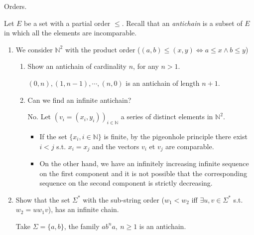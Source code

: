 \documentclass[a4paper,11pt]{exam}
\newcommand{\N}{\mathbb{N}}
\begin{document}
	
	\colorbox{gris}{
		\begin{minipage}[c]{15cm}
			Orders.
		\end{minipage}
	}
	
	
	
	
	\begin{questions}
		\question
		Let $E$ be a set with a partial order $\leq$.
		Recall that an \textit{antichain} is a subset of $E$ in which all the elements are incomparable.
		
		\begin{enumerate}
			\item We consider $ \N^2 $ with the product order ($(a,b)\leq(x,y) \iff a\leq x \wedge b \leq y$)
			\begin{enumerate}
				\item Show an  antichain of cardinality $n$, for any $n >1$.
				
				\begin{solution}
					$(0,n), (1,n-1), \cdots, (n,0)$ is an antichain of length $n+1$.
				\end{solution}
				
				\item Can we find an infinite  antichain?
				
				\begin{solution}
					No.
					Let $(v_i = (x_i, y_i))_{i \in \N}$ a series of distinct elements in $\N^2$.
					\begin{itemize}
						\item If the set $\{ x_i, i \in \N \}$ is finite, by the pigeonhole principle there exist $i<j$ s.t. $x_i = x_j$ and the vectors $v_i$ et $v_j$ are comparable.
						\item On the other hand, we have an infinitely increasing infinite sequence on the first component and it is not possible that the corresponding sequence on the second component is strictly decreasing.
					\end{itemize}
				\end{solution}
			\end{enumerate}
			
			\item Show that the set $\Sigma^* $ with the sub-string order ($w_1<w_2 $ iff $ \exists u,v\in\Sigma^* $ s.t. $ w_2 = uw_1v$), has an infinite chain.
			
			\begin{solution}
				Take $\Sigma = \{ a,b \}$,
				the family $ab^na,~ n \geq 1$ is an antichain.
			\end{solution}
		\end{enumerate}
		

\end{questions}
\end{document}
